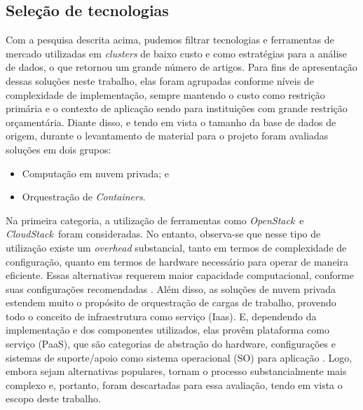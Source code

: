 \subsection{Seleção de tecnologias}

Com a pesquisa descrita acima, pudemos filtrar tecnologias e ferramentas de mercado utilizadas em \emph{clusters }de baixo custo e como estratégias para a análise de dados, o que retornou um grande número de artigos.  Para fins de apresentação dessas soluções neste trabalho, elas foram agrupadas conforme níveis de complexidade de implementação, sempre mantendo o custo como restrição primária e o contexto de aplicação sendo para instituições com grande restrição orçamentária.
Diante disso, e tendo em vista o tamanho da base de dados de origem, durante o levantamento de material para o projeto foram avaliadas soluções em dois grupos:

\begin{itemize}
    \item Computação em nuvem privada; e
    \item Orquestração de \emph{Containers}.
\end{itemize}



Na primeira categoria, a utilização de ferramentas como \emph{OpenStack}\textregistered \ e \emph{CloudStack}\textregistered \ foram consideradas. No entanto, observa-se que nesse tipo de utilização existe um \emph{overhead} substancial, tanto em termos de complexidade de configuração, quanto em termos de hardware necessário para operar de maneira eficiente. Essas alternativas requerem maior capacidade computacional, conforme suas configurações recomendadas \cite{cloudstack,openstack}. Além disso, as soluções de nuvem privada estendem muito o propósito de orquestração de cargas de trabalho, provendo todo o conceito de infraestrutura como serviço (Iaas). E, dependendo da implementação e dos componentes utilizados, elas provêm plataforma como serviço (PaaS), que são categorias de abstração do hardware, configurações e sistemas de suporte/apoio como sistema operacional (SO) para aplicação \cite{openstack,cloudstack,mell_nist_2011}. Logo, embora sejam alternativas populares, tornam o processo substancialmente mais complexo e, portanto, foram descartadas para essa avaliação, tendo em vista o escopo deste trabalho.


